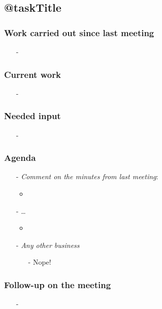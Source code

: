 \subsection{@taskTitle}
\label{task:@label}

\subsubsection{Work carried out since last meeting}
\begin{itemize}
    \item[-]
\end{itemize}

\subsubsection{Current work}
\begin{itemize}
    \item[-] 
\end{itemize}

\subsubsection{Needed input}
\begin{itemize}
    \item[-] 
\end{itemize}

\subsubsection{Agenda}
\begin{enumerate}
    \item[-] \textit{Comment on the minutes from last meeting}:
    \begin{itemize}
        \item
    \end{itemize}
    
    \item[-] \ldots
    \begin{itemize}
        \item
    \end{itemize}
    \item[-] \textit{Any other business}
    \begin{itemize}
        \item[-] Nope!
    \end{itemize}
\end{enumerate}

\subsubsection{Follow-up on the meeting}
\begin{itemize}
    \item[-] 
\end{itemize}
